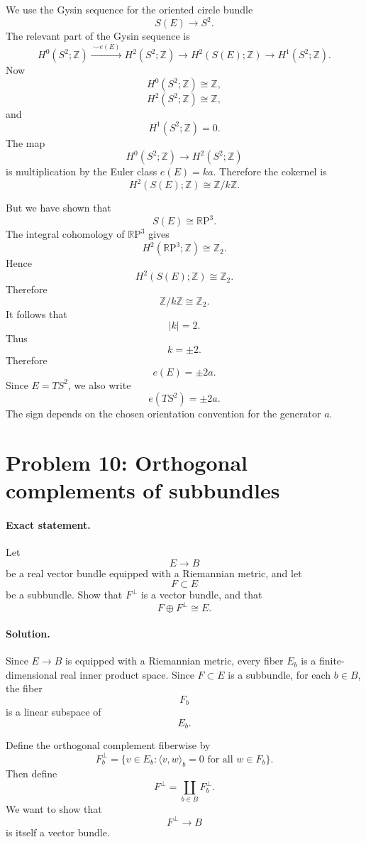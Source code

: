 \documentclass[12pt,a4paper]{article}
\newcommand{\RP}{\mathbb{R}\mathrm{P}}
\theoremstyle{notespace}
\begin{document}
	We use the Gysin sequence for the oriented circle bundle
	\[
	S(E)\to S^{2}.
	\]
	The relevant part of the Gysin sequence is
	\[
	H^{0}(S^{2};\mathbb Z)
	\xrightarrow{\ \smile e(E)\ }
	H^{2}(S^{2};\mathbb Z)
	\longrightarrow
	H^{2}(S(E);\mathbb Z)
	\longrightarrow
	H^{1}(S^{2};\mathbb Z).
	\]
	Now
	\[
	H^{0}(S^{2};\mathbb Z)\cong \mathbb Z,
	\]
	\[
	H^{2}(S^{2};\mathbb Z)\cong \mathbb Z,
	\]
	and
	\[
	H^{1}(S^{2};\mathbb Z)=0.
	\]
	The map
	\[
	H^{0}(S^{2};\mathbb Z)\to H^{2}(S^{2};\mathbb Z)
	\]
	is multiplication by the Euler class \(e(E)=ka\). Therefore the cokernel is
	\[
	H^{2}(S(E);\mathbb Z)\cong \mathbb Z/k\mathbb Z.
	\]
	
	But we have shown that
	\[
	S(E)\cong \RP^{3}.
	\]
	The integral cohomology of \(\RP^{3}\) gives
	\[
	H^{2}(\RP^{3};\mathbb Z)\cong \mathbb Z_{2}.
	\]
	Hence
	\[
	H^{2}(S(E);\mathbb Z)\cong \mathbb Z_{2}.
	\]
	Therefore
	\[
	\mathbb Z/k\mathbb Z\cong \mathbb Z_{2}.
	\]
	It follows that
	\[
	|k|=2.
	\]
	Thus
	\[
	k=\pm 2.
	\]
	Therefore
	\[
	\boxed{e(E)=\pm 2a.}
	\]
	Since \(E=TS^{2}\), we also write
	\[
	\boxed{e(TS^{2})=\pm 2a.}
	\]
	The sign depends on the chosen orientation convention for the generator \(a\).
	
	\section{Problem 10: Orthogonal complements of subbundles}
	
	\paragraph{Exact statement.}
	Let
	\[
	E\to B
	\]
	be a real vector bundle equipped with a Riemannian metric, and let
	\[
	F\subset E
	\]
	be a subbundle. Show that \(F^{\perp}\) is a vector bundle, and that
	\[
	F\oplus F^{\perp}\cong E.
	\]
	
	\paragraph{Solution.}
	Since \(E\to B\) is equipped with a Riemannian metric, every fiber \(E_{b}\) is a finite-dimensional real inner product space. Since \(F\subset E\) is a subbundle, for each \(b\in B\), the fiber
	\[
	F_{b}
	\]
	is a linear subspace of
	\[
	E_{b}.
	\]
	
	Define the orthogonal complement fiberwise by
	\[
	F_{b}^{\perp}
	=
	\{v\in E_{b}:\langle v,w\rangle_{b}=0
	\text{ for all }w\in F_{b}\}.
	\]
	Then define
	\[
	F^{\perp}
	=
	\coprod_{b\in B}F_{b}^{\perp}.
	\]
	We want to show that
	\[
	F^{\perp}\to B
	\]
	is itself a vector bundle.
	
\end{document}
